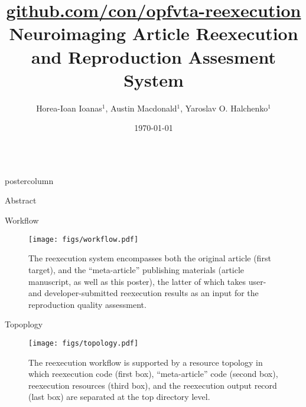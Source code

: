 

\title{
	\href{https://github.com/con/opfvta-reexecution}{
		\Large github.com/con/opfvta-reexecution
	}\\\vspace{.15em}
	Neuroimaging Article Reexecution and Reproduction Assesment System
}
\author{
	Horea-Ioan Ioanas$^{1}$,
	Austin Macdonald$^{1}$,
	Yaroslav O. Halchenko$^{1}$
}
\date{\today}

\newlength{\columnheight}
\setlength{\columnheight}{0.881\textheight}



\begin{frame}
\begin{columns}
	\begin{column}{.42\textwidth}
		\begin{beamercolorbox}[center]{postercolumn}
			\begin{minipage}{.98\textwidth}  %
				\parbox[t][\columnheight]{\textwidth}{ %
					\begin{myblock}{Abstract}
						
					\end{myblock}\vfill
					\vspace{-0.3em}
					\begin{myblock}{Workflow}
						\vspace{0.5em}
						\begin{figure}
							\texttt{[image: figs/workflow.pdf]}
							\caption{
								The reexecution system encompasses both the original article (first target), and the “meta-article” publishing materials (article manuscript, as well as this poster), the latter of which takes user- and developer-submitted reexecution results as an input for the reproduction quality assessment. 
							}
						\end{figure}
					\end{myblock}\vfill
					\vspace{-0.3em}
					\begin{myblock}{Topoplogy}
						\vspace{0.5em}
						\begin{figure}
							\captionsetup{width=.9\linewidth}
							\texttt{[image: figs/topology.pdf]}
							\caption{
								The reexecution workflow is supported by a resource topology in which reexecution code (first box), “meta-article” code (second box), reexecution resources (third box), and the reexecution output record (last box) are separated at the top directory level.
}
\end{figure}
\end{myblock}}
\end{minipage}
\end{beamercolorbox}
\end{column}
\end{columns}
\end{frame}
